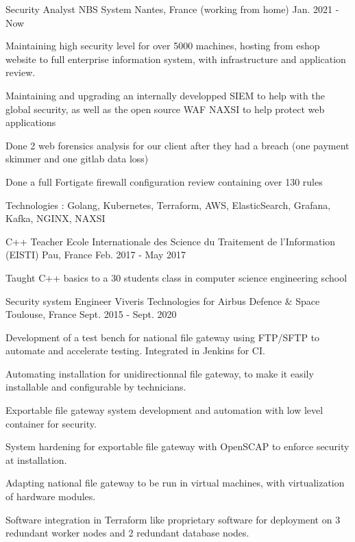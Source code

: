 \begin{cventries}
  \cventry
  {Security Analyst}
  {NBS System}
  {Nantes, France (working from home)}
  {Jan. 2021 - Now}
  {
  \begin{cvitems}
    \item {Maintaining high security level for over 5000 machines, hosting from eshop website to full enterprise information system, with infrastructure and application review.}
    \item {Maintaining and upgrading an internally developped SIEM to help with the global security, as well as the open source WAF NAXSI to help protect web applications}
    \item {Done 2 web forensics analysis for our client after they had a breach (one payment skimmer and one gitlab data loss)}
    \item {Done a full Fortigate firewall configuration review containing over 130 rules}
    \item {Technologies : Golang, Kubernetes, Terraform, AWS, ElasticSearch, Grafana, Kafka, NGINX, NAXSI}
  \end{cvitems}
  }
  \cventry
  {C++ Teacher}
  {Ecole Internationale des Science du Traitement de l'Information (EISTI)}
  {Pau, France}
  {Feb. 2017 - May 2017}
  {
  \begin{cvitems}
    \item {Taught C++ basics to a 30 students class in computer science engineering school}
  \end{cvitems}
  }
  \cventry
  {Security system Engineer}
  {Viveris Technologies for Airbus Defence \& Space}
  {Toulouse, France}
  {Sept. 2015 - Sept. 2020}
  {
  \begin{cvitems}
    \item {Development of a test bench for national file gateway using FTP/SFTP to automate and accelerate testing. Integrated in Jenkins for CI.}
    \item {Automating installation for unidirectionnal file gateway, to make it easily installable and configurable by technicians.}
    \item {Exportable file gateway system development and automation with low level container for security.}
    \item {System hardening for exportable file gateway with OpenSCAP to enforce security at installation.}
    \item {Adapting national file gateway to be run in virtual machines, with virtualization of hardware modules.}
    \item {Software integration in Terraform like proprietary software for deployment on 3 redundant worker nodes and 2 redundant database nodes.}

\end{cvitems}}
\end{cventries}
